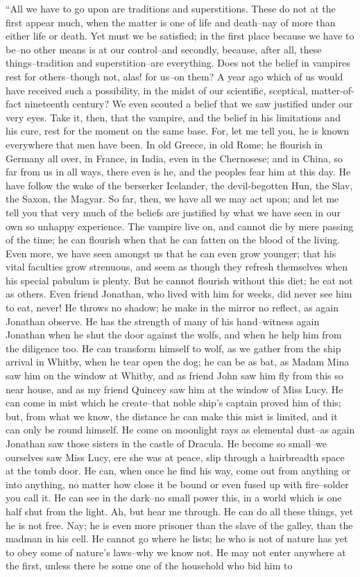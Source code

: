 \documentclass[12pt,openright]{book}
\begin{document}
“All we have to go upon are traditions and superstitions. These do not at the first appear much, when the matter is one of life and death–nay of more than either life or death. Yet must we be satisfied; in the first place because we have to be–no other means is at our control–and secondly, because, after all, these things–tradition and superstition–are everything. Does not the belief in vampires rest for others–though not, alas! for us–on them? A year ago which of us would have received such a possibility, in the midst of our scientific, sceptical, matter-of-fact nineteenth century? We even scouted a belief that we saw justified under our very eyes. Take it, then, that the vampire, and the belief in his limitations and his cure, rest for the moment on the same base. For, let me tell you, he is known everywhere that men have been. In old Greece, in old Rome; he flourish in Germany all over, in France, in India, even in the Chernosese; and in China, so far from us in all ways, there even is he, and the peoples fear him at this day. He have follow the wake of the berserker Icelander, the devil-begotten Hun, the Slav, the Saxon, the Magyar. So far, then, we have all we may act upon; and let me tell you that very much of the beliefs are justified by what we have seen in our own so unhappy experience. The vampire live on, and cannot die by mere passing of the time; he can flourish when that he can fatten on the blood of the living. Even more, we have seen amongst us that he can even grow younger; that his vital faculties grow strenuous, and seem as though they refresh themselves when his special pabulum is plenty. But he cannot flourish without this diet; he eat not as others. Even friend Jonathan, who lived with him for weeks, did never see him to eat, never! He throws no shadow; he make in the mirror no reflect, as again Jonathan observe. He has the strength of many of his hand–witness again Jonathan when he shut the door against the wolfs, and when he help him from the diligence too. He can transform himself to wolf, as we gather from the ship arrival in Whitby, when he tear open the dog; he can be as bat, as Madam Mina saw him on the window at Whitby, and as friend John saw him fly from this so near house, and as my friend Quincey saw him at the window of Miss Lucy. He can come in mist which he create–that noble ship’s captain proved him of this; but, from what we know, the distance he can make this mist is limited, and it can only be round himself. He come on moonlight rays as elemental dust–as again Jonathan saw those sisters in the castle of Dracula. He become so small–we ourselves saw Miss Lucy, ere she was at peace, slip through a hairbreadth space at the tomb door. He can, when once he find his way, come out from anything or into anything, no matter how close it be bound or even fused up with fire–solder you call it. He can see in the dark–no small power this, in a world which is one half shut from the light. Ah, but hear me through. He can do all these things, yet he is not free. Nay; he is even more prisoner than the slave of the galley, than the madman in his cell. He cannot go where he lists; he who is not of nature has yet to obey some of nature’s laws–why we know not. He may not enter anywhere at the first, unless there be some one of the household who bid him to 
\end{document}
